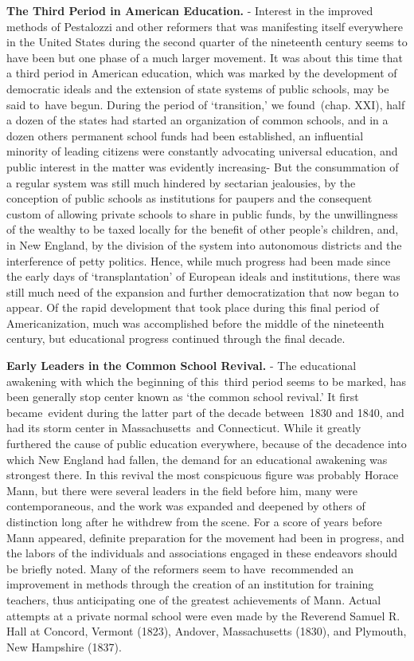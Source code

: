 \documentclass[]{book}
\begin{document}
\textbf{The Third Period in American Education.} - Interest in the improved methods of Pestalozzi and other reformers that was manifesting itself everywhere in the United States during the second quarter of the nineteenth century seems to have been but one phase of a much larger movement. It was about this time that a third period in American education, which was marked by the development of democratic ideals and the extension of state systems of public schools, may be said to~have begun. During the period of `transition,' we found~(chap. XXI), half a dozen of the states had started an organization of common schools, and in a dozen others permanent school funds had been established, an influential minority of leading citizens were constantly advocating universal education, and public interest in the matter was evidently increasing- But the consummation of a regular system was still much hindered by sectarian jealousies, by the conception of public schools as institutions for paupers and the consequent custom of allowing private schools to share in public funds, by the unwillingness of the wealthy to be taxed locally for the benefit of other people's children, and, in New England, by the division of the system into autonomous districts and the interference of petty politics. Hence, while much progress had been made since the early days of `transplantation' of European ideals and institutions, there was still much need of the expansion and further democratization that now began to appear. Of the rapid development that took place during this final period of Americanization, much was accomplished before the middle of the nineteenth century, but educational progress continued through the final decade.

\textbf{Early Leaders in the Common School Revival.} - The educational awakening with which the beginning of this~third period seems to be marked, has been generally stop center known as `the common school revival.' It first became~evident during the latter part of the decade between~1830 and 1840, and had its storm center in Massachusetts~and Connecticut. While it greatly furthered the cause of public education everywhere, because of the decadence into which New England had fallen, the demand for an educational awakening was strongest there. In this revival the most conspicuous figure was probably Horace Mann, but there were several leaders in the field before him, many were contemporaneous, and the work was expanded and deepened by others of distinction long after he withdrew from the scene. For a score of years before Mann appeared, definite preparation for the movement had been in progress, and the labors of the individuals and associations engaged in these endeavors should be briefly noted. Many of the reformers seem to have\emph{~}recommended an improvement in methods through the creation of an institution for training teachers, thus anticipating one of the greatest achievements of Mann. Actual attempts at a private normal school were even made by the Reverend Samuel R. Hall at Concord, Vermont (1823), Andover, Massachusetts (1830), and Plymouth, New Hampshire (1837).
\end{document}
